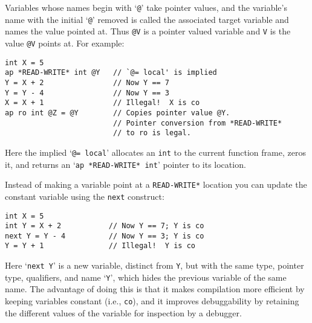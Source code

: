 \documentclass[12pt]{article}
\newenvironment{indpar}[1][0.3in]%
	{\begin{list}{}%
		     {\setlength{\itemsep}{0in}%
		      \setlength{\topsep}{0in}%
		      \setlength{\parsep}{1ex}%
		      \setlength{\labelwidth}{#1}%
		      \setlength{\leftmargin}{#1}%
		      \addtolength{\leftmargin}{\labelsep}}%
	 \item}%
	{\end{list}}
\begin{document}
Variables whose names begin with `{\tt @}' take pointer values, and
the variable's name with the
initial `{\tt @}' removed is called the associated
target variable and names the value pointed at.
Thus {\tt @V} is a pointer valued variable and {\tt V} is the value
{\tt @V} points at.
For example:

\begin{indpar}\begin{verbatim}
int X = 5
ap *READ-WRITE* int @Y   // `@= local' is implied
Y = X + 2                // Now Y == 7
Y = Y - 4                // Now Y == 3
X = X + 1                // Illegal!  X is co
ap ro int @Z = @Y        // Copies pointer value @Y.
                         // Pointer conversion from *READ-WRITE*
                         // to ro is legal.
\end{verbatim}\end{indpar}

Here the implied `{\tt @= local}' allocates an {\tt int} to the current
function frame, zeros it, and returns an `{\tt ap *READ-WRITE* int}'
pointer to its location.

Instead of making a variable point at a {\tt *READ-WRITE*} location you
can update the constant variable using the {\tt next} construct:
\begin{indpar}\begin{verbatim}
int X = 5
int Y = X + 2           // Now Y == 7; Y is co
next Y = Y - 4          // Now Y == 3; Y is co
Y = Y + 1               // Illegal!  Y is co
\end{verbatim}\end{indpar}
Here `{\tt next Y}' is a new variable, distinct from {\tt Y},
but with the same type, pointer type, qualifiers, and name `{\tt Y}',
which hides the previous variable of the same name.
The advantage of doing this is that it makes compilation more
efficient by keeping variables constant (i.e., {\tt co}), and
it improves debuggability by retaining the different values of
the variable for inspection by a debugger.
\end{document}
